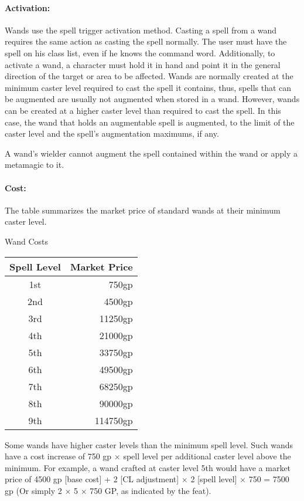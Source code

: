 \paragraph{Activation:} Wands use the spell trigger activation method. Casting a spell from a wand requires the same action as casting the spell normally. 
The user must have the spell on his class list, even if he knows the command word. 
Additionally, to activate a wand, a character must hold it in hand and point it in the general direction of the target or area to be affected.
Wands are normally created at the minimum caster level required to cast the spell it contains, thus, spells that can be augmented are usually not augmented when stored in a wand. 
However, wands can be created at a higher caster level than required to cast the spell. 
In this case, the wand that holds an augmentable spell is augmented, to the limit of the caster level and the spell's augmentation maximums, if any. 

A wand's wielder cannot augment the spell contained within the wand or apply a metamagic to it.

\paragraph{Cost:} The  table summarizes the market price of standard wands at their minimum caster level.

\begin{tableonecolumn}
\caption{Wand Costs}
\label{tab:WandCosts}
\begin{tabular}{|c|r|}
\hline
\textbf{Spell Level}&\textbf{Market Price}\\
\hline
1st&750gp\\
2nd&4500gp\\
3rd&11250gp\\
4th&21000gp\\
5th&33750gp\\
6th&49500gp\\
7th&68250gp\\
8th&90000gp\\
9th&114750gp\\
\hline
\end{tabular}
\end{tableonecolumn}
Some wands have higher caster levels than the minimum spell level. Such wands have a cost increase of 750 gp $\times$ spell level per additional caster level above the minimum. For example, a  wand crafted at caster level 5th would have a market price of 4500 gp [base cost] + 2 [CL adjustment] $\times$ 2 [spell level] $\times$ 750 = 7500 gp (Or simply 2 $\times$ 5 $\times$ 750 GP, as indicated by the  feat).

